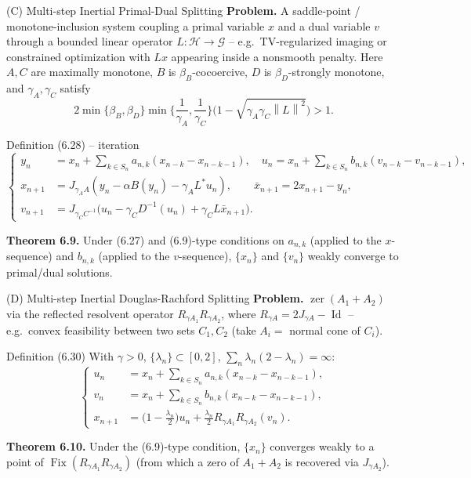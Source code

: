 \documentclass[aspectratio=169,10pt]{beamer}
\newcommand{\Hil}{\mathcal{H}}
\newcommand{\Gil}{\mathcal{G}}
\newcommand{\norm}[1]{\left\|#1\right\|}
\newcommand{\Fix}{\operatorname{Fix}}
\newcommand{\zer}{\operatorname{zer}}
\newcommand{\Id}{\operatorname{Id}}
\begin{document}
\begin{frame}{(C) Multi-step Inertial Primal-Dual Splitting}
\textbf{Problem.} A saddle-point / monotone-inclusion system coupling a
primal variable $x$ and a dual variable $v$ through a bounded linear
operator $L:\Hil\to\Gil$ -- e.g.\ TV-regularized imaging or constrained
optimization with $Lx$ appearing inside a nonsmooth penalty. Here $A,C$ are
maximally monotone, $B$ is $\beta_B$-cocoercive, $D$ is $\beta_D$-strongly
monotone, and $\gamma_A,\gamma_C$ satisfy
\[
2\min\{\beta_B,\beta_D\}\min\Big\{\frac1{\gamma_A},\frac1{\gamma_C}\Big\}
\Big(1-\sqrt{\gamma_A\gamma_C\norm{L}^2}\Big) > 1. \tag{6.27}
\]
\begin{block}{Definition (6.28) -- iteration}
\[
\left\{
\begin{aligned}
y_n &= x_n+\!\!\sum_{k\in S_n}\!\! a_{n,k}(x_{n-k}-x_{n-k-1}), \quad
u_n = x_n+\!\!\sum_{k\in S_n}\!\! b_{n,k}(v_{n-k}-v_{n-k-1}), \\
x_{n+1} &= J_{\gamma_A A}(y_n-\alpha B(y_n)-\gamma_A L^\ast u_n), \qquad
\bar x_{n+1} = 2x_{n+1}-y_n, \\
v_{n+1} &= J_{\gamma_C C^{-1}}\big(u_n-\gamma_C D^{-1}(u_n)+\gamma_C L\bar x_{n+1}\big).
\end{aligned}
\right.
\]
\end{block}
\textbf{Theorem 6.9.} Under (6.27) and (6.9)-type conditions on $a_{n,k}$
(applied to the $x$-sequence) and $b_{n,k}$ (applied to the $v$-sequence),
$\{x_n\}$ and $\{v_n\}$ weakly converge to primal/dual solutions.
\end{frame}

\begin{frame}{(D) Multi-step Inertial Douglas-Rachford Splitting}
\textbf{Problem.} $\zer(A_1+A_2)$ via the reflected resolvent operator
$R_{\gamma A_1}R_{\gamma A_2}$, where $R_{\gamma A}=2J_{\gamma A}-\Id$ --
e.g.\ convex feasibility between two sets $C_1,C_2$ (take $A_i=$ normal
cone of $C_i$).
\begin{block}{Definition (6.30)}
With $\gamma>0$, $\{\lambda_n\}\subset[0,2]$, $\sum_n\lambda_n(2-\lambda_n)=\infty$:
\[
\left\{
\begin{aligned}
u_n &= x_n + \sum_{k\in S_n} a_{n,k}(x_{n-k}-x_{n-k-1}), \\
v_n &= x_n + \sum_{k\in S_n} b_{n,k}(x_{n-k}-x_{n-k-1}), \\
x_{n+1} &= \Big(1-\frac{\lambda_n}{2}\Big)u_n + \frac{\lambda_n}{2} R_{\gamma A_1}R_{\gamma A_2}(v_n).
\end{aligned}
\right.
\]
\end{block}
\textbf{Theorem 6.10.} Under the (6.9)-type condition, $\{x_n\}$ converges
weakly to a point of $\Fix(R_{\gamma A_1}R_{\gamma A_2})$ (from which a
zero of $A_1+A_2$ is recovered via $J_{\gamma A_2}$).
\end{frame}
\end{document}
